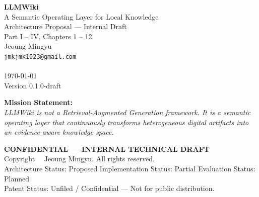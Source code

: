 ﻿\documentclass[11pt,a4paper,oneside]{book}
\theoremstyle{definition}
\theoremstyle{plain}
\theoremstyle{remark}
\theoremstyle{definition}
\begin{document}
\frontmatter


\thispagestyle{empty}
\vspace*{3cm}
\begin{center}
    {\fontsize{48}{58}\selectfont\bfseries\color{LLMWikiDarkBlue} LLMWiki}\\[1em]
    {\fontsize{20}{24}\selectfont\color{LLMWikiAccent} A Semantic Operating Layer for Local Knowledge}\\[2em]
    {\fontsize{14}{17}\selectfont\color{LLMWikiMedium} Architecture Proposal --- Internal Draft}\\[3em]
    {\large\color{LLMWikiMuted} Part I -- IV, Chapters 1 -- 12}\\[2em]
    {\large Jeoung Mingyu}\\
    {\color{LLMWikiMuted} \texttt{jmkjmk1023@gmail.com}}\\
    {\color{LLMWikiMuted} }\\[2em]
    {\color{LLMWikiMuted} \today}\\[1em]
    {\small\color{LLMWikiMuted} Version 0.1.0-draft}
\end{center}
\vfill
\begin{center}
    \begin{tcolorbox}[colback=LLMWikiLightBlue!10,colframe=LLMWikiBlue,width=0.8\textwidth]
        \centering
        \small\color{LLMWikiDarkBlue}
        \textbf{Mission Statement:}\\
        \textit{LLMWiki is not a Retrieval-Augmented Generation framework. It is a semantic operating layer that continuously transforms heterogeneous digital artifacts into an evidence-aware knowledge space.}
    \end{tcolorbox}
\end{center}
\vspace{1em}
\begin{center}
    \begin{tcolorbox}[colback=red!5,colframe=red!60!black,width=0.8\textwidth]
        \centering
        \small
        \textbf{CONFIDENTIAL --- INTERNAL TECHNICAL DRAFT}\\
        Copyright \textcopyright\ \the\year\ Jeoung Mingyu. All rights reserved.\\
        Architecture Status: Proposed \quad Implementation Status: Partial \quad Evaluation Status: Planned\\
        Patent Status: Unfiled / Confidential --- Not for public distribution.
    \end{tcolorbox}
\end{center}
\end{document}
